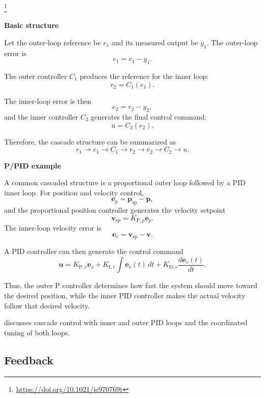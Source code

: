 \documentclass{book}
\providecommand{\ProjectDeepHeading}[2]{%
    \par\medskip\noindent\textbf{#2}\par\smallskip
}
\providecommand{\seeherefooter}[1]{\footnote{\url{#1}}}
\begin{document}
   \seeherefooter{https://doi.org/10.1021/ie970769t}

   \ProjectDeepHeading{1}{Basic structure}
      Let the outer-loop reference be $r_1$ and its measured output be $y_1$. The outer-loop error is
      \[
         e_1=r_1-y_1.
      \]

      The outer controller $C_1$ produces the reference for the inner loop:
      \[
         r_2=C_1(e_1).
      \]

      The inner-loop error is then
      \[
         e_2=r_2-y_2,
      \]
      and the inner controller $C_2$ generates the final control command:
      \[
         u=C_2(e_2).
      \]

      Therefore, the cascade structure can be summarized as
      \[
         r_1
         \rightarrow
         e_1
         \rightarrow
         C_1
         \rightarrow
         r_2
         \rightarrow
         e_2
         \rightarrow
         C_2
         \rightarrow
         u.
      \]

   \ProjectDeepHeading{1}{P/PID example}
      A common cascaded structure is a proportional outer loop followed by a PID inner loop. For position and velocity control,
      \[
         \mathbf{e}_p
         =
         \mathbf{p}_{\mathrm{sp}}-\mathbf{p},
      \]
      and the proportional position controller generates the velocity setpoint
      \[
         \mathbf{v}_{\mathrm{sp}}
         =
         K_{\mathrm{P},p}\mathbf{e}_p.
      \]
      The inner-loop velocity error is
      \[
         \mathbf{e}_v
         =
         \mathbf{v}_{\mathrm{sp}}-\mathbf{v}.
      \]

      A PID controller can then generate the control command
      \[
         \mathbf{u}
         =
         K_{\mathrm{P},v}\mathbf{e}_v
         +
         K_{\mathrm{I},v}\int \mathbf{e}_v(t)\,dt
         +
         K_{\mathrm{D},v}\frac{d\mathbf{e}_v(t)}{dt}.
      \]

      Thus, the outer P controller determines how fast the system should move toward the desired position, while the inner PID controller makes the actual velocity follow that desired velocity.

      \cite{lee-1998-pid-controller-tuning-for-cascade-control-systems} discusses cascade control with inner and outer PID loops and the coordinated tuning of both loops.

\subsection{Feedback}
\end{document}
